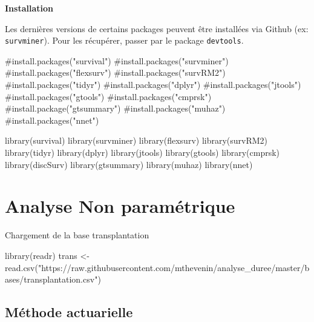 \documentclass[
  12pt,
  letterpaper,
  DIV=11,
  numbers=noendperiod,
  onepage,
  openany]{scrreprt}
\newenvironment{Shaded}{\begin{snugshade}}{\end{snugshade}}
\newcommand{\CommentTok}[1]{\textcolor[rgb]{0.50,0.62,0.50}{#1}}
\newcommand{\FunctionTok}[1]{\textcolor[rgb]{0.94,0.94,0.56}{#1}}
\newcommand{\NormalTok}[1]{\textcolor[rgb]{0.80,0.80,0.80}{#1}}
\newcommand{\OtherTok}[1]{\textcolor[rgb]{0.94,0.94,0.56}{#1}}
\newcommand{\StringTok}[1]{\textcolor[rgb]{0.80,0.58,0.58}{#1}}
\begin{document}
\textbf{Installation}

Les dernières versions de certains packages peuvent être installées via
Github (ex: \texttt{survminer}). Pour les récupérer, passer par le
package \texttt{devtools}.

\begin{Shaded}
\begin{Highlighting}[]
\CommentTok{\#install.packages("survival")}
\CommentTok{\#install.packages("survminer")}
\CommentTok{\#install.packages("flexsurv")}
\CommentTok{\#install.packages("survRM2")}
\CommentTok{\#install.packages("tidyr")}
\CommentTok{\#install.packages("dplyr")}
\CommentTok{\#install.packages("jtools")}
\CommentTok{\#install.packages("gtools")}
\CommentTok{\#install.packages("cmprsk")}
\CommentTok{\#install.package("gtsummary")}
\CommentTok{\#install.packages("muhaz")}
\CommentTok{\#install.packages("nnet")}

\FunctionTok{library}\NormalTok{(survival)}
\FunctionTok{library}\NormalTok{(survminer)}
\FunctionTok{library}\NormalTok{(flexsurv)}
\FunctionTok{library}\NormalTok{(survRM2)}
\FunctionTok{library}\NormalTok{(tidyr)}
\FunctionTok{library}\NormalTok{(dplyr)}
\FunctionTok{library}\NormalTok{(jtools)}
\FunctionTok{library}\NormalTok{(gtools)}
\FunctionTok{library}\NormalTok{(cmprsk)}
\FunctionTok{library}\NormalTok{(discSurv)}
\FunctionTok{library}\NormalTok{(gtsummary)}
\FunctionTok{library}\NormalTok{(muhaz)}
\FunctionTok{library}\NormalTok{(nnet)}
\end{Highlighting}
\end{Shaded}

\hypertarget{analyse-non-paramuxe9trique}{%
\section{Analyse Non paramétrique}\label{analyse-non-paramuxe9trique}}

Chargement de la base transplantation

\begin{Shaded}
\begin{Highlighting}[]
\FunctionTok{library}\NormalTok{(readr)}
\NormalTok{trans }\OtherTok{\textless{}{-}} \FunctionTok{read.csv}\NormalTok{(}\StringTok{"https://raw.githubusercontent.com/mthevenin/analyse\_duree/master/bases/transplantation.csv"}\NormalTok{)}
\end{Highlighting}
\end{Shaded}

\hypertarget{muxe9thode-actuarielle}{%
\subsection{Méthode actuarielle}\label{muxe9thode-actuarielle}}
\end{document}
